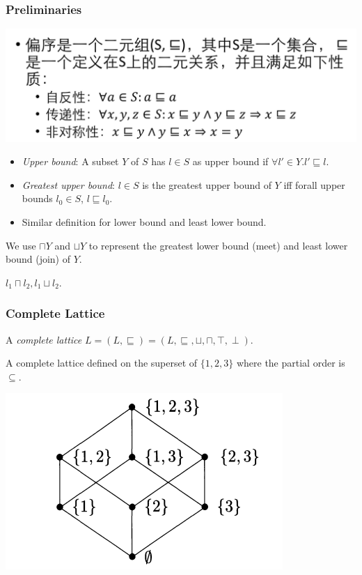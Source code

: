 \documentclass[aspectratio=1610, 13pt]{beamer}
\begin{document}
\begin{frame}\frametitle{Preliminaries}
\begin{definition}
\begin{center}

\includegraphics[scale=0.23]{pos.png}
\end{center}

\end{definition}
\begin{itemize}
\item \emph{Upper bound}: A subset $Y$ of $S$ has $l\in S$ as upper bound if $\forall l'\in Y. l' \sqsubseteq l$.
\item \emph{Greatest upper bound}: $l\in S$ is the greatest upper bound of $Y$ iff forall upper bounds $l_0\in S$, $l \sqsubseteq l_0$.
\item 
Similar definition for lower bound and least lower bound.

\end{itemize}

We use $\sqcap Y$ and $\sqcup Y$ to represent the greatest lower bound (meet) and least lower bound (join) of $Y$. 

$l_1 \sqcap l_2, l_1 \sqcup l_2$.

\end{frame}


\begin{frame}\frametitle{Complete Lattice}
\begin{definition}
A \emph{complete lattice} $L = (L, \sqsubseteq) = (L, \sqsubseteq, \sqcup, \sqcap, \top, \perp)$.

\end{definition}
\begin{example}
A complete lattice defined on the superset of $\{1,2,3\}$ where the partial order is $\subseteq$.
\begin{center}
\includegraphics[scale=0.4]{complete_lattice_example.png}
\end{center}
\end{example}
\end{frame}
\end{document}
